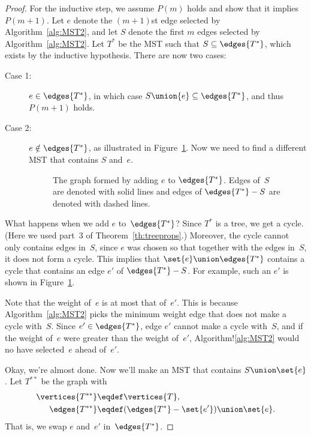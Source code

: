\begin{proof}
For the inductive step, we assume $P(m)$ holds and show that it
implies $P(m + 1)$.  Let $e$ denote the $(m+1)$st edge selected by
Algorithm~\ref{alg:MST2}, and let $S$ denote the first $m$ edges
selected by Algorithm~\ref{alg:MST2}.  Let $T^*$ be the
MST such that $S \subseteq \edges{T^*}$, which exists by the inductive
hypothesis.  There are now two cases:
\begin{description}

\item[Case 1:] $e \in \edges{T^*}$, in which case $S \union \{e\}
  \subseteq \edges{T^*}$, and thus $P(m+1)$ holds.

\item[Case 2:]
$e \notin \edges{T^*}$, as illustrated in Figure~\ref{fig:5KD}.  Now we need
  to find a different MST that contains $S$ and~$e$.

\begin{figure}


\caption{The graph formed by adding $e$ to $\edges{T^*}$.  Edges of~$S$ are
  denoted with solid lines and edges of $\edges{T^*} - S$ are denoted with
  dashed lines.}

\label{fig:5KD}
\end{figure}

\end{description}

What happens when we add $e$ to~$\edges{T^*}$?  Since $T^*$ is a tree,
we get a cycle.  (Here we used part~3 of Theorem~\ref{th:treeprops}.)
Moreover, the cycle cannot only contains edges in~$S$, since $e$ was
chosen so that together with the edges in~$S$, it does not form a
cycle.  This implies that $\set{e} \union \edges{T^*}$ contains a
cycle that contains an edge $e'$ of $\edges{T^*} - S$.  For example,
such an $e'$ is shown in Figure~\ref{fig:5KD}.

Note that the weight of~$e$ is at most that of~$e'$.  This is because
Algorithm~\ref{alg:MST2} picks the minimum weight edge that does not
make a cycle with~$S$.  Since $e' \in \edges{T^*}$, edge $e'$ cannot
make a cycle with~$S$, and if the weight of~$e$ were greater than the
weight of~$e'$, Algorithm!\ref{alg:MST2} would no have selected~$e$
ahead of~$e'$.

Okay, we're almost done.  Now we'll make an MST that contains $S
\union \set{e}$.  Let $T^{**}$ be the graph with
\begin{align*}
\vertices{T^{**}} & \eqdef \vertices{T},\\
\edges{T^{**}} & \eqdef (\edges{T^*} - \set{e'}) \union \set{e}.
\end{align*}
That is, we swap $e$ and~$e'$ in~$\edges{T^*}$.


\end{proof}
